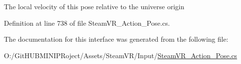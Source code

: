 The local velocity of this pose relative to the universe origin 



Definition at line 738 of file Steam\+V\+R\+\_\+\+Action\+\_\+\+Pose.\+cs.



The documentation for this interface was generated from the following file\+:\begin{DoxyCompactItemize}
\item 
O\+:/\+Git\+H\+U\+B\+M\+I\+N\+I\+P\+Roject/\+Assets/\+Steam\+V\+R/\+Input/\mbox{\hyperlink{_steam_v_r___action___pose_8cs}{Steam\+V\+R\+\_\+\+Action\+\_\+\+Pose.\+cs}}\end{DoxyCompactItemize}
